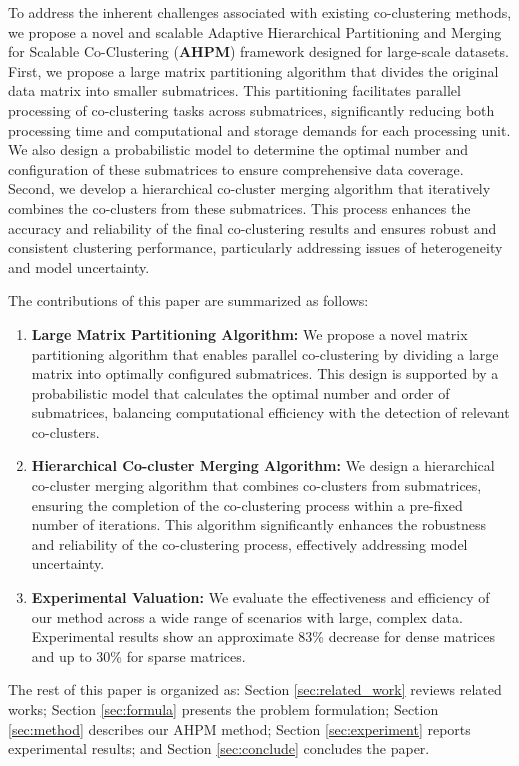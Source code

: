 To address the inherent challenges associated with existing co-clustering methods, we propose a novel and scalable Adaptive Hierarchical Partitioning and Merging for Scalable Co-Clustering (\textbf{AHPM}) framework designed for large-scale datasets. First,  we propose a large matrix partitioning algorithm that divides the original data matrix into smaller submatrices. This partitioning facilitates parallel processing of co-clustering tasks across submatrices, significantly reducing both processing time and computational and storage demands for each processing unit. We also design a probabilistic model to determine the optimal number and configuration of these submatrices to ensure comprehensive data coverage.
Second, we develop a hierarchical co-cluster merging algorithm that iteratively combines the co-clusters from these submatrices. This process enhances the accuracy and reliability of the final co-clustering results and ensures robust and consistent clustering performance, particularly addressing issues of heterogeneity and model uncertainty.

The contributions of this paper are summarized as follows:
\begin{enumerate}
    \item \textbf{Large Matrix Partitioning Algorithm:}
          We propose a novel matrix partitioning algorithm that enables parallel co-clustering by dividing a large matrix into optimally configured submatrices. This design is supported by a probabilistic model that calculates the optimal number and order of submatrices, balancing computational efficiency with the detection of relevant co-clusters.
    \item \textbf{Hierarchical Co-cluster Merging Algorithm:}
          We design a hierarchical co-cluster merging algorithm that combines co-clusters from submatrices, ensuring the completion of the co-clustering process within a pre-fixed number of iterations. This algorithm significantly enhances the robustness and reliability of the co-clustering process, effectively addressing model uncertainty.
    \item \textbf{Experimental Valuation:}
          We evaluate the effectiveness and efficiency of our method across a wide range of scenarios with large, complex data. Experimental results show an approximate 83\% decrease for dense matrices and up to 30\% for sparse matrices.
\end{enumerate}

The rest of this paper is organized as: Section \ref{sec:related_work} reviews related works; Section \ref{sec:formula} presents the problem formulation; Section \ref{sec:method} describes our AHPM method; Section \ref{sec:experiment} reports experimental results; and Section \ref{sec:conclude} concludes the paper.
